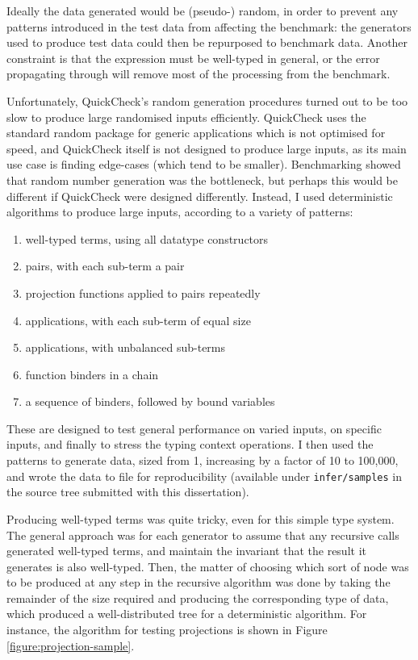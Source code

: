 Ideally the data generated would be (pseudo-) random, in order to prevent any patterns introduced in the test data from affecting the benchmark: the generators used to produce test data could then be repurposed to benchmark data.
Another constraint is that the expression must be well-typed in general, or the error propagating through will remove most of the processing from the benchmark.

Unfortunately, QuickCheck's random generation procedures turned out to be too slow to produce large randomised inputs efficiently.
QuickCheck uses the standard random package for generic applications which is not optimised for speed, and QuickCheck itself is not designed to produce large inputs, as its main use case is finding edge-cases (which tend to be smaller).
Benchmarking showed that random number generation was the bottleneck, but perhaps this would be different if QuickCheck were designed differently.
Instead, I used deterministic algorithms to produce large inputs, according to a variety of patterns:
\begin{enumerate}
\item well-typed terms, using all datatype constructors
\item pairs, with each sub-term a pair
\item projection functions applied to pairs repeatedly
\item applications, with each sub-term of equal size
\item applications, with unbalanced sub-terms
\item function binders in a chain
\item a sequence of binders, followed by bound variables
\end{enumerate}
These are designed to test general performance on varied inputs, on specific inputs, and finally to stress the typing context operations.
I then used the patterns to generate data, sized from 1, increasing by a factor of 10 to 100,000, and wrote the data to file for reproducibility (available under \texttt{infer/samples} in the source tree submitted with this dissertation).

Producing well-typed terms was quite tricky, even for this simple type system.
The general approach was for each generator to assume that any recursive calls generated well-typed terms, and maintain the invariant that the result it generates is also well-typed.
Then, the matter of choosing which sort of node was to be produced at any step in the recursive algorithm was done by taking the remainder of the size required and producing the corresponding type of data, which produced a well-distributed tree for a deterministic algorithm.
For instance, the algorithm for testing projections is shown in Figure \ref{figure:projection-sample}.

